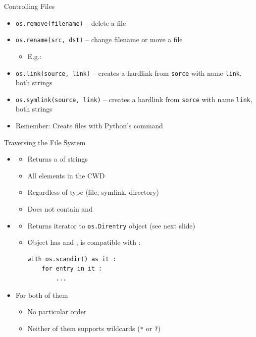 
\begin{frame}{Controlling Files}
%
\begin{itemize}
\item \texttt{os.remove(filename)} -- delete a file
\item \texttt{os.rename(src, dst)} -- change filename or move a file
	\begin{itemize}
	\item E.\;g.: 
	\end{itemize}
\item \texttt{os.link(source, link)} -- creates a hardlink from \texttt{sorce} with name \texttt{link}, both strings
\item \texttt{os.symlink(source, link)} -- creates a hardlink from \texttt{sorce} with name \texttt{link}, both strings
\item Remember: Create files with Python's  command
\end{itemize}
%
\end{frame}


\begin{frame}[fragile]{Traversing the File System}
%
\begin{itemize}
\item {}
	\begin{itemize}
	\item Returns a  of strings
	\item All elements in the CWD
	\item Regardless of type (file, symlink, directory)
	\item Does not contain  and 
	\end{itemize}
\item {}
	\begin{itemize}
	\item Returns iterator to \texttt{os.Direntry} object (see next slide)
	\item Object has  and , \ie is compatible with :\\
\begin{verbatim}
with os.scandir() as it :
    for entry in it :
        ...
\end{verbatim}
	\end{itemize}
\item For both of them
	\begin{itemize}
	\item No particular order
	\item Neither of them supports wildcards (\texttt{*} or \texttt{?})
	\end{itemize}
\end{itemize}
%
\end{frame}

